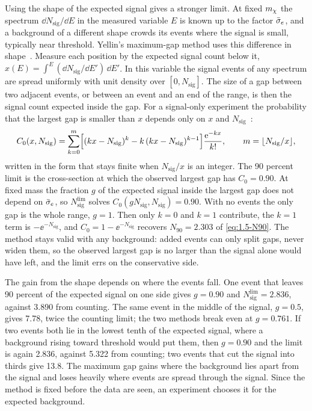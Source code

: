 Using the shape of the expected signal gives a stronger limit. At fixed $m_{\chi}$ the spectrum $\dd N_{\mathrm{sig}}/\dd E$ in the measured variable $E$ is known up to the factor $\bar{\sigma}_{e}$, and a background of a different shape crowds its events where the signal is small, typically near threshold. Yellin's maximum-gap method uses this difference in shape~\cite{yellin2002finding}. Measure each position by the expected signal count below it, $x(E) = \int^E(\dd N_{\mathrm{sig}}/\dd E')\,\dd E'$. In this variable the signal events of any spectrum are spread uniformly with unit density over $[0, N_{\mathrm{sig}}]$. The size of a gap between two adjacent events, or between an event and an end of the range, is then the signal count expected inside the gap. For a signal-only experiment the probability that the largest gap is smaller than $x$ depends only on $x$ and $N_{\mathrm{sig}}$~\cite[Eq.~(2)]{yellin2002finding}:
\begin{equation}
  C_0(x, N_{\mathrm{sig}}) = \sum_{k=0}^{m}\Bigl[(kx - N_{\mathrm{sig}})^k - k\,(kx - N_{\mathrm{sig}})^{k-1}\Bigr]\frac{\mathrm{e}^{-kx}}{k!} , \qquad m = \lfloor N_{\mathrm{sig}}/x\rfloor ,
  \label{eq:21.5-C0}
\end{equation}
written in the form that stays finite when $N_{\mathrm{sig}}/x$ is an integer. The 90 percent limit is the cross-section at which the observed largest gap has $C_0 = 0.90$. At fixed mass the fraction $g$ of the expected signal inside the largest gap does not depend on $\bar{\sigma}_{e}$, so $N_{\mathrm{sig}}^{\mathrm{lim}}$ solves $C_0(gN_{\mathrm{sig}}, N_{\mathrm{sig}}) = 0.90$. With no events the only gap is the whole range, $g = 1$. Then only $k = 0$ and $k = 1$ contribute, the $k = 1$ term is $-\ee^{-N_{\mathrm{sig}}}$, and $C_0 = 1 - \ee^{-N_{\mathrm{sig}}}$ recovers $N_{90} = 2.303$ of \cref{eq:1.5-N90}. The method stays valid with any background: added events can only split gaps, never widen them, so the observed largest gap is no larger than the signal alone would have left, and the limit errs on the conservative side.

The gain from the shape depends on where the events fall. One event that leaves 90 percent of the expected signal on one side gives $g = 0.90$ and $N_{\mathrm{sig}}^{\mathrm{lim}} = 2.836$, against 3.890 from counting. The same event in the middle of the signal, $g = 0.5$, gives 7.78, twice the counting limit; the two methods break even at $g = 0.761$. If two events both lie in the lowest tenth of the expected signal, where a background rising toward threshold would put them, then $g = 0.90$ and the limit is again 2.836, against 5.322 from counting; two events that cut the signal into thirds give 13.8. The maximum gap gains where the background lies apart from the signal and loses heavily where events are spread through the signal. Since the method is fixed before the data are seen, an experiment chooses it for the expected background.

